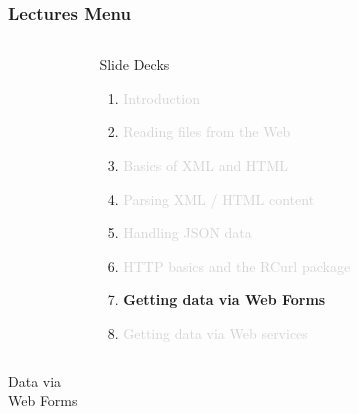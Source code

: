 \documentclass{beamer}\usepackage[]{graphicx}\usepackage[]{color}
\begin{document}
\begin{frame}
\frametitle{Lectures Menu}

\begin{columns}[t]
\begin{column}{0.1\textwidth}
\end{column}
\begin{column}{0.8\textwidth}
 \begin{block}{Slide Decks}
  \begin{enumerate}
   \item \textcolor{lightgray}{Introduction}
   \item \textcolor{lightgray}{Reading files from the Web}
   \item \textcolor{lightgray}{Basics of XML and HTML}
   \item \textcolor{lightgray}{Parsing XML / HTML content}
   \item \textcolor{lightgray}{Handling JSON data}
   \item \textcolor{lightgray}{HTTP basics and the RCurl package}
   \item \textbf{Getting data via Web Forms}
   \item \textcolor{lightgray}{Getting data via Web services}
  \end{enumerate}
 \end{block}
\end{column}
\begin{column}{0.1\textwidth}
\end{column}
\end{columns}

\end{frame}


\begin{frame}
 \begin{center}
  \Huge{\textcolor{mandarina}{Data via \\ Web Forms}}
 \end{center}
\end{frame}

\end{document}
